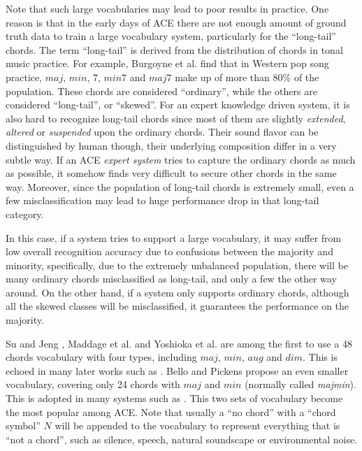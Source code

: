 Note that such large vocabularies may lead to poor results in practice. One reason is that in the early days of ACE there are not enough amount of ground truth data to train a large vocabulary system, particularly for the ``long-tail'' chords. The term ``long-tail'' is derived from the distribution of chords in tonal music practice. For example, Burgoyne et al. \cite{burgoyne2011expert} find that in Western pop song practice, $maj$, $min$, $7$, $min7$ and $maj7$ make up of more than $80\%$ of the population. These chords are considered ``ordinary'', while the others are considered ``long-tail'', or ``skewed''. For an expert knowledge driven system, it is also hard to recognize long-tail chords since most of them are slightly {\it extended}, {\it altered} or {\it suspended} upon the ordinary chords. Their sound flavor can be distinguished by human though, their underlying composition differ in a very subtle way. If an ACE {\it expert system} tries to capture the ordinary chords as much as possible, it somehow finds very difficult to secure other chords in the same way. Moreover, since the population of long-tail chords is extremely small, even a few misclassification may lead to huge performance drop in that long-tail category.

In this case, if a system tries to support a large vocabulary, it may suffer from low overall recognition accuracy due to confusions between the majority and minority, specifically, due to the extremely unbalanced population, there will be many ordinary chords misclassified as long-tail, and only a few the other way around. On the other hand, if a system only supports ordinary chords, although all the skewed classes will be misclassified, it guarantees the performance on the majority. \cite{deng2016hybrid}

Su and Jeng \cite{su2001multi}, Maddage et al. \cite{maddage2004content} and Yoshioka et al. \cite{yoshioka2004automatic} are among the first to use a 48 chords vocabulary with four types, including $maj$, $min$, $aug$ and $dim$. This is echoed in many later works such  as \cite{harte2005automatic,catteau2007probabilistic,burgoyne2007cross,su2001multi,papadopoulos2008simultaneous}. Bello and Pickens \cite{bello2005robust} propose an even smaller vocabulary, covering only 24 chords with $maj$ and $min$ (normally called {\it majmin}). This is adopted in many systems such as \cite{ryynanen2008automatic,weil2008hmm,khadkevich2009use,weller2009structured,ni2012end,cho2010exploring,humphrey2012rethinking}. This two sets of vocabulary become the most popular among ACE. Note that usually a ``no chord'' with a ``chord symbol'' $N$ will be appended to the vocabulary to represent everything that is ``not a chord'', such as silence, speech, natural soundscape or environmental noise.

